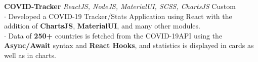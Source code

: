 \documentclass[a4paper]{article}
\begin{document}
\vspace*{2mm}

{\textbf{COVID-Tracker}} {\sl ReactJS, NodeJS, MaterialUI, SCSS, ChartsJS} \hfill Custom\\
$\cdot$ Developed a COVID-19 Tracker/Stats Application using React with the addition of {\textbf{ChartsJS}}, {\textbf{MaterialUI}}, and many other modules.\\ $\cdot$ Data of {\textbf{250+}} countries is fetched from the COVID-19API using the {\textbf{Async/Await}} syntax and {\textbf{React Hooks}}, and statistics is displayed in cards as well as in charts.\\
\vspace*{2mm}



\ 
\end{document}
